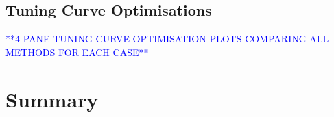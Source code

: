 \documentclass[../main.tex]{subfiles}
\begin{document}
\subsection{Tuning Curve Optimisations}

\textcolor{blue}{**4-PANE TUNING CURVE OPTIMISATION PLOTS COMPARING ALL METHODS FOR EACH CASE**}
 
\section{Summary}
\end{document}
